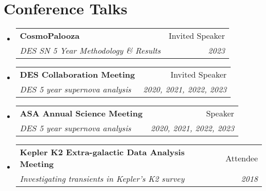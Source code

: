 \documentclass[letterpaper,11pt]{article}
\makeatletter
\newcommand{\resumeItem}[1]{
  \item\small{
    {#1 \vspace{-2pt}}
  }
}
\newcommand{\resumeSubheading}[4]{
  \vspace{-2pt}\item
    \begin{tabular*}{0.97\textwidth}[t]{l@{\extracolsep{\fill}}r}
      \textbf{#1} & #2 \\
      \textit{\small#3} & \textit{\small #4} \\
    \end{tabular*}\vspace{-7pt}
}
\newcommand{\resumeSubHeadingListStart}{\begin{itemize}[leftmargin=0.15in, label={}]}
\newcommand{\resumeSubHeadingListEnd}{\end{itemize}}
\newcommand{\resumeItemListStart}{\begin{itemize}}
\newcommand{\resumeItemListEnd}{\end{itemize}\vspace{-5pt}}
\newcommand{\conferenceElement}[5]{%
    \resumeSubHeadingListStart
        \resumeSubheading
            {#1}
            {#2}
            {#3}
            {#4}
            \ifthenelse{\isempty{#5}}{}{%
                \resumeItemListStart
                    \renewcommand*{\do}[1]{\resumeItem{##1}}
                    \docsvlist{#5}%
                \resumeItemListEnd
            }%
    \resumeSubHeadingListEnd
}
\makeatother
\begin{document}
\section{Conference Talks}

    \conferenceElement{CosmoPalooza}{Invited Speaker}{DES SN 5 Year Methodology \& Results}{2023}{}
    \conferenceElement{DES Collaboration Meeting}{Invited Speaker}{DES 5 year supernova analysis}{2020, 2021, 2022, 2023}{}
    \conferenceElement{ASA Annual Science Meeting}{Speaker}{DES 5 year supernova analysis}{2020, 2021, 2022, 2023}{}
    \conferenceElement{Kepler K2 Extra-galactic Data Analysis Meeting}{Attendee}{Investigating transients in Kepler's K2 survey}{2018}{}

\end{document}
